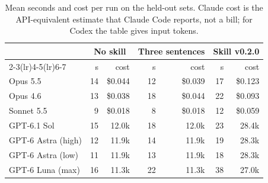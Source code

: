 \begin{table}[t]\centering\small
\caption{Mean seconds and cost per run on the held-out sets. Claude cost is the API-equivalent estimate that Claude Code reports, not a bill; for Codex the table gives input tokens.}\label{tab:cost}
\begin{tabular}{lrrrrrr}
\toprule
 & \multicolumn{2}{c}{No skill} & \multicolumn{2}{c}{Three sentences} & \multicolumn{2}{c}{Skill v0.2.0} \\
\cmidrule(lr){2-3}\cmidrule(lr){4-5}\cmidrule(lr){6-7}
 & s & cost & s & cost & s & cost \\
\midrule
Opus 5.5 & 14 & \$0.044 & 12 & \$0.039 & 17 & \$0.123 \\
Opus 4.6 & 13 & \$0.038 & 18 & \$0.044 & 22 & \$0.093 \\
Sonnet 5.5 & 9 & \$0.018 & 8 & \$0.018 & 12 & \$0.059 \\
GPT-6.1 Sol & 15 & 12.0k & 18 & 12.0k & 23 & 28.4k \\
GPT-6 Astra (high) & 12 & 11.9k & 14 & 11.9k & 19 & 28.3k \\
GPT-6 Astra (low) & 11 & 11.9k & 13 & 11.9k & 18 & 28.3k \\
GPT-6 Luna (max) & 16 & 11.3k & 22 & 11.3k & 38 & 27.0k \\
\bottomrule
\end{tabular}
\end{table}
